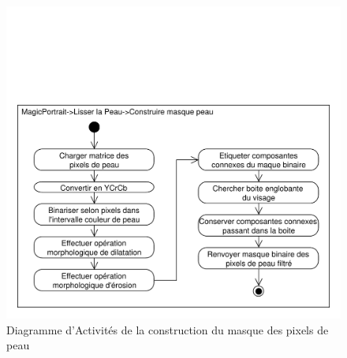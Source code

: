 \documentclass[11pt, french,screen]{report-rd-info}
\begin{document}
\begin{figure}
\centering
\includegraphics[scale=0.5]{Diagrammes/DiagrammeActivites_11_LissagePeau_Masque}
\caption{Diagramme d'Activités de la construction du masque des pixels de peau}
\label{diag:diagramme11}
\end{figure}
\end{document}
